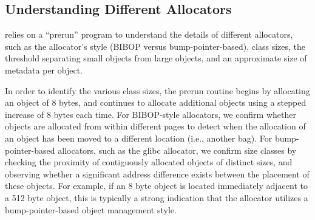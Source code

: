 
\label{sec:implement}





\subsection{Understanding Different Allocators}

\label{sec:understandingallocators}

\MP{} relies on a ``prerun'' program to understand the details of different allocators, such as the allocator's style (BIBOP versus bump-pointer-based), class sizes, the threshold separating small objects from large objects, and an approximate size of metadata per object. 

In order to identify the various class sizes, the prerun routine begins by allocating an object of 8 bytes, and continues to allocate  additional objects using a stepped increase of 8 bytes each time. For BIBOP-style allocators, we confirm whether objects are allocated from within different pages to detect when the allocation of an object has been moved to a different location (i.e., another bag). 
For bump-pointer-based allocators, such as the glibc allocator, we confirm size classes by checking the proximity of contiguously allocated objects of distinct sizes, and observing whether a significant address difference exists between the placement of these objects. For example, if an 8 byte object is located immediately adjacent to a 512 byte object, this is typically a strong indication that the allocator utilizes a bump-pointer-based object management style.

